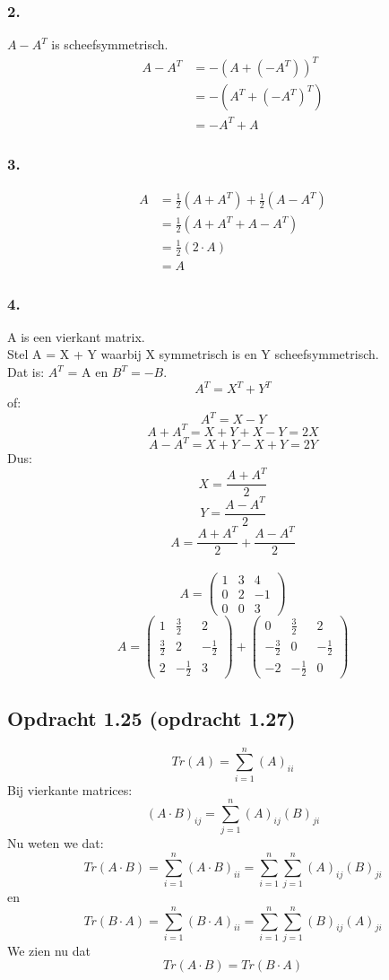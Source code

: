\documentclass[lineaire_algebra_oplossingen.tex]{subfiles}
\begin{document}
\subsubsection*{2.}
$A - A^T$ is scheefsymmetrisch.
\begin{align*}
A - A^T
&= -(A+(-A^T))^T \\
&= -(A^T + (-A^T)^T) \\
&= -A^T + A
\end{align*}
\subsubsection*{3.}
\begin{align*}
A 
&= \frac{1}{2}(A + A^T) + \frac{1}{2}(A - A^T) \\
&= \frac{1}{2}(A + A^T + A - A^T) \\
&= \frac{1}{2}(2\cdot A) \\
&= A
\end{align*}
\subsubsection*{4.}
A is een vierkant matrix.\\
Stel A = X + Y waarbij X symmetrisch is en Y scheefsymmetrisch.\\
Dat is: $A^T$ = A en $B^T = -B$.
$$A^T = X^T + Y^T$$
of: $$A^T = X - Y$$
$$A + A^T = X + Y + X - Y = 2X$$
$$A - A^T = X + Y - X + Y = 2Y$$
Dus:
$$X = \frac{A + A^T}{2}$$
$$Y = \frac{A - A^T}{2}$$
$$A = \frac{A + A^T}{2} + \frac{A - A^T}{2}$$
\\
$$
A = \begin{pmatrix}
1 & 3 & 4\\
0 & 2 & -1\\
0 & 0 & 3
\end{pmatrix}
$$
$$
A = \begin{pmatrix}
1 & \frac{3}{2} & 2\\
\frac{3}{2} & 2 & -\frac{1}{2}\\
2 & -\frac{1}{2} & 3
\end{pmatrix}
+
\begin{pmatrix}
0 & \frac{3}{2} & 2\\
-\frac{3}{2} & 0 & -\frac{1}{2}\\
-2 & -\frac{1}{2} & 0
\end{pmatrix}
$$
\subsection{Opdracht 1.25 (opdracht 1.27)}
\[
Tr(A) = \sum^{n}_{i=1}(A)_{ii}
\]
Bij vierkante matrices:
\[
(A\cdot B)_{ij} = \sum^{n}_{j=1}(A)_{ij}(B)_{ji}
\]
Nu weten we dat:
\[
Tr(A\cdot B) =\sum^{n}_{i=1}(A\cdot B)_{ii}=\sum^{n}_{i=1}\sum^{n}_{j=1}(A)_{ij}(B)_{ji}
\]
en
\[
Tr(B\cdot A) =\sum^{n}_{i=1}(B\cdot A)_{ii}=\sum^{n}_{i=1}\sum^{n}_{j=1}(B)_{ij}(A)_{ji}
\]
We zien nu dat
\[
Tr(A\cdot B) = Tr(B\cdot A)
\]
\end{document}
